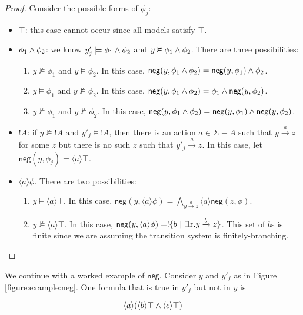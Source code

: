 \begin{proof}
Consider the possible forms of $\phi_j$:
\begin{itemize}
\item
$\top$: this case cannot occur since all models satisfy $\top$.
\item
$\phi_1 \land \phi_2$: we know $y'_j \models \phi_1 \land \phi_2$ and $y \nvDash \phi_1 \land \phi_2$. There are three possibilities:
\begin{enumerate}
\item
$y \nvDash \phi_1$ and $y \models \phi_2$. In this case, $\mathsf{neg}(y, \phi_1 \land \phi_2) = \mathsf{neg}(y, \phi_1) \land \phi_2$.
\item
$y \models \phi_1$ and $y \nvDash \phi_2$. In this case, $\mathsf{neg}(y, \phi_1 \land \phi_2) = \phi_1 \land \mathsf{neg}(y, \phi_2)$.
\item
$y \nvDash \phi_1$ and $y \nvDash \phi_2$. In this case, $\mathsf{neg}(y, \phi_1 \land \phi_2) =  \mathsf{neg}(y, \phi_1) \land \mathsf{neg}(y, \phi_2)$.
\end{enumerate}
\item
$!A$: if $y \nvDash !A \mbox{ and } y'_j \models !A$, then there is an action $a \in \Sigma-A$ such that $y \xrightarrow{a} z$ for some $z$ but there is no such $z$ such that $y'_j \xrightarrow{a} z$. In this case, let $\mathsf{neg}(y, \phi_j) = \langle a \rangle \top$.
\item
$\langle a \rangle \phi$. There are two possibilities:
\begin{enumerate}
\item
$y \models \langle a \rangle \top$. In this case, $\mathsf{neg}(y, \langle a \rangle \phi) =  \bigwedge\limits_{y \xrightarrow{a} z}  \langle a \rangle \mathsf{neg}(z, \phi)$.
\item
$y \nvDash \langle a \rangle \top$. In this case, $\mathsf{neg}(y, \langle a \rangle \phi) = ! \{ b \ | \  \exists z. y \xrightarrow{b} z\}$. This set of $b$s is finite since we are assuming the transition system  is finitely-branching.
\end{enumerate}
\end{itemize}

\end{proof}



\NI We continue with a worked example of $\mathsf{neg}$.  Consider
  $y$ and $y'_j$ as in Figure \ref{figure:example:neg}.  One formula
  that is true in $y'_j$ but not in $y$ is

\[
   \langle a \rangle (\langle b \rangle \top \land \langle c \rangle \top)
\]

